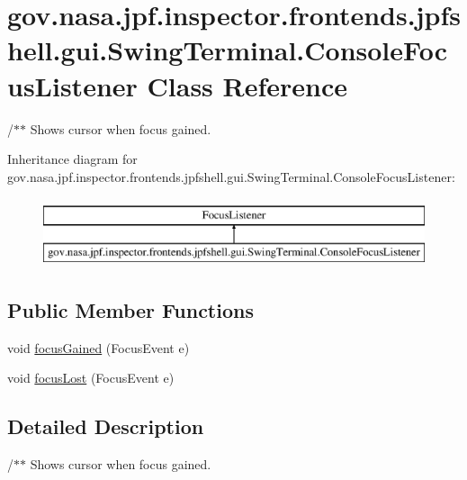 \hypertarget{classgov_1_1nasa_1_1jpf_1_1inspector_1_1frontends_1_1jpfshell_1_1gui_1_1_swing_terminal_1_1_console_focus_listener}{}\section{gov.\+nasa.\+jpf.\+inspector.\+frontends.\+jpfshell.\+gui.\+Swing\+Terminal.\+Console\+Focus\+Listener Class Reference}
\label{classgov_1_1nasa_1_1jpf_1_1inspector_1_1frontends_1_1jpfshell_1_1gui_1_1_swing_terminal_1_1_console_focus_listener}


/$\ast$$\ast$ Shows cursor when focus gained.  


Inheritance diagram for gov.\+nasa.\+jpf.\+inspector.\+frontends.\+jpfshell.\+gui.\+Swing\+Terminal.\+Console\+Focus\+Listener\+:\begin{figure}[H]
\begin{center}
\leavevmode
\includegraphics[height=2.000000cm]{classgov_1_1nasa_1_1jpf_1_1inspector_1_1frontends_1_1jpfshell_1_1gui_1_1_swing_terminal_1_1_console_focus_listener}
\end{center}
\end{figure}
\subsection*{Public Member Functions}
\begin{DoxyCompactItemize}
\item 
void \hyperlink{classgov_1_1nasa_1_1jpf_1_1inspector_1_1frontends_1_1jpfshell_1_1gui_1_1_swing_terminal_1_1_console_focus_listener_a3ce5c7eab65ca90115115bb1068e556c}{focus\+Gained} (Focus\+Event e)
\item 
void \hyperlink{classgov_1_1nasa_1_1jpf_1_1inspector_1_1frontends_1_1jpfshell_1_1gui_1_1_swing_terminal_1_1_console_focus_listener_a025f83585a60b60cd022c1536253d16c}{focus\+Lost} (Focus\+Event e)
\end{DoxyCompactItemize}


\subsection{Detailed Description}
/$\ast$$\ast$ Shows cursor when focus gained. 

